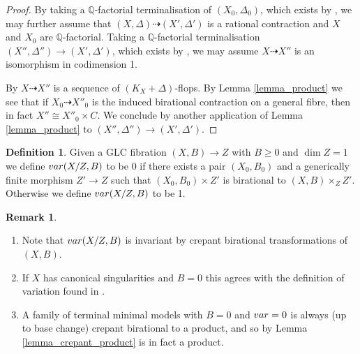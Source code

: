 \documentclass[12pt]{amsart}
\theoremstyle{plain}
\theoremstyle{definition}
\newtheorem{definition}[theorem]{Definition}
\newtheorem{remark}[theorem]{Remark}
\def\dim{\operatorname{dim}}
\def\rar{\rightarrow}
\def\drar{\dashrightarrow}
\begin{document}
\begin{proof}
By taking a $\mathbb Q$-factorial 
terminalisation of $(X_0,\Delta_0)$,
which exists by \cite[Corollary 1.4.3]{BCHM06}, we may further assume 
that $(X,\Delta) \drar (X',\Delta')$ is a rational contraction and 
$X$ and $X_0$ are $\mathbb Q$-factorial.
Taking a $\mathbb Q$-factorial terminalisation $(X'',\Delta'') \rar (X',\Delta')$, 
which exists by \cite[Corollary 1.4.3]{BCHM06}, we may assume
$X \drar X''$ is an isomorphism in codimension 1.

By \cite{Kawamata07} $X \drar X''$ is a sequence of $(K_X+\Delta)$-flops.
By Lemma \ref{lemma_product} we see that if $X_0 \dashrightarrow X''_0$ is 
the induced birational contraction
on a general fibre, then in fact $X'' \cong X''_0\times C$.  
We conclude by another application of Lemma \ref{lemma_product} to $(X'', \Delta'') \rar (X', \Delta')$.
\end{proof}


\begin{definition}
\label{var_circ}
Given a GLC fibration $(X, B) \rightarrow Z$ with $B \geq 0$ and $\dim Z = 1$ 
we define ${\rm var}(X/Z, B)$ to be $0$ if there exists a pair $(X_0, B_0)$
and a generically finite morphism $Z' \rightarrow Z$ such that
$(X_0, B_0)\times Z'$ is birational to $(X, B)\times_ZZ'$.  Otherwise
we define ${\rm var}(X/Z, B)$ to be 1.
\end{definition}


\begin{remark}
\label{rem_variation}
\begin{enumerate}
\item Note that ${\rm var}(X/Z, B)$ is invariant by 
crepant birational transformations of $(X, B)$.

\item If $X$ has canonical singularities and $B = 0$ this agrees with the definition
of variation found in \cite{Kawamata85a}. 

\item A family of terminal minimal models with $B = 0$ and 
${\rm var} = 0$ is always (up to base change)
crepant birational to a product, and so by Lemma \ref{lemma_crepant_product} 
is in fact a product.

\end{enumerate}

\end{remark}
\end{document}
